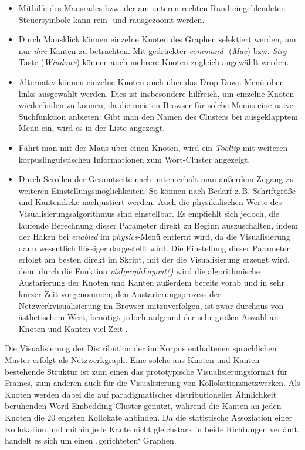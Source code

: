 \begin{itemize}
\item
  Mithilfe des Mausrades bzw. der am unteren rechten Rand eingeblendeten Steuersymbole kann rein- und rausgezoomt werden.
\item
  Durch Mausklick können einzelne Knoten des Graphen selektiert werden, um nur \emph{ihre} Kanten zu betrachten. Mit gedrückter \emph{command}- (\emph{Mac}) bzw. \emph{Strg}-Taste (\emph{Windows}) können auch mehrere Knoten zugleich angewählt werden.
\item
  Alternativ können einzelne Knoten auch über das Drop-Down-Menü oben links ausgewählt werden. Dies ist insbesondere hilfreich, um einzelne Knoten wiederfinden zu können, da die meisten Browser für solche Menüs eine naive Suchfunktion anbieten: Gibt man den Namen des Clusters bei ausgeklapptem Menü ein, wird es in der Liste angezeigt.
\item
  Fährt man mit der Maus über einen Knoten, wird ein \emph{Tooltip} mit weiteren korpuslinguistischen Informationen zum Wort-Cluster angezeigt.
\item
  Durch Scrollen der Gesamtseite nach unten erhält man außerdem Zugang zu weiteren Einstellungsmöglichkeiten. So können nach Bedarf z.\,B. Schriftgröße und Kantendicke nachjustiert werden. Auch die physikalischen Werte des Visualisierungsalgorithmus sind einstellbar. Es empfiehlt sich jedoch, die laufende Berechnung dieser Parameter direkt zu Beginn auszuschalten, indem der Haken bei \emph{enabled} im \emph{physics}-Menü entfernt wird, da die Visualisierung dann wesentlich flüssiger dargestellt wird. Die Einstellung dieser Parameter erfolgt am besten direkt im Skript, mit der die Visualisierung erzeugt wird, denn durch die Funktion \emph{visIgraphLayout()} wird die algorithmische Austarierung der Knoten und Kanten außerdem bereits vorab und in sehr kurzer Zeit vorgenommen; den Austarierungsprozess der Netzwerkvisualisierung im Browser mitzuverfolgen, ist zwar durchaus von ästhetischem Wert, benötigt jedoch aufgrund der sehr großen Anzahl an Knoten und Kanten viel Zeit \autocite[siehe zum Netzwerkgraphen innewohnenden „Zauber``][184-188]{bubenhoferVisuelleLinguistikZur2020}.
\end{itemize}

Die Visualisierung der Distribution der im Korpus enthaltenen sprachlichen Muster erfolgt als Netzwerkgraph. Eine solche aus Knoten und Kanten bestehende Struktur ist zum einen das prototypische Visualisierungsformat für Frames, zum anderen auch für die Visualisierung von Kollokationsnetzwerken. Als Knoten werden dabei die auf paradigmatischer distributioneller Ähnlichkeit beruhenden Word-Embedding-Cluster genutzt, während die Kanten an jeden Knoten die 20 engsten Kollokate anbinden. Da die statistische Assoziation einer Kollokation und mithin jede Kante nicht gleichstark in beide Richtungen verläuft, handelt es sich um einen ‚gerichteten` Graphen.


